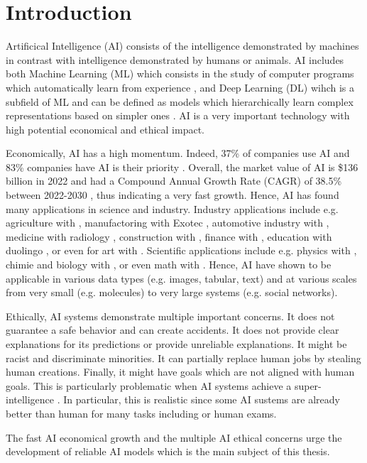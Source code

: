 \chapter{Introduction}
\label{chap:introduction}

Artificical Intelligence (AI) consists of the intelligence demonstrated by machines in contrast with intelligence demonstrated by humans or animals.
AI includes both Machine Learning (ML) which consists in the study of computer programs which automatically learn from experience \citep{Mitchell97}, and Deep Learning (DL) wihch is a subfield of ML and can be defined as models which hierarchically learn complex representations based on simpler ones \citep{GoodBengCour16}.
AI is a very important technology with high potential economical and ethical impact. 

Economically, AI has a high momentum. Indeed, 37\% of companies use AI  and 83\% companies have AI is their priority . Overall, the market value of AI is \$136 billion in 2022  and had a Compound Annual Growth Rate (CAGR) of 38.5\% between 2022-2030 , thus indicating a very fast growth.
Hence, AI has found many applications in science and industry. 
Industry applications include e.g. agriculture with , manufactoring with Exotec , automotive industry with , medicine with radiology , construction with , finance with , education with duolingo , or even for art with .
Scientific applications include e.g. physics with , chimie and biology with , or even math with .
Hence, AI have shown to be applicable in various data types (e.g. images, tabular, text) and at various scales from very small (e.g. molecules) to very large systems (e.g. social networks).

Ethically, AI systems demonstrate multiple important concerns.
It does not guarantee a safe behavior and can create accidents.
It does not provide clear explanations for its predictions or provide unreliable explanations.
It might be racist and discriminate minorities.
It can partially replace human jobs by stealing human creations.
Finally, it might have goals which are not aligned with human goals. This is particularly problematic when AI systems achieve a super-intelligence . In particular, this is realistic since some AI sustems are already better than human for many tasks including  or human exams.

The fast AI economical growth and the multiple AI ethical concerns urge the development of reliable AI models which is the main subject of this thesis.

